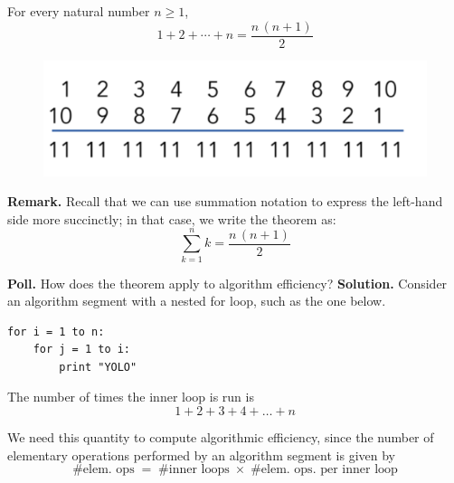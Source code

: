 \documentclass[10pt]{beamer}
\begin{document}
\begin{frame}

\begin{mygreenbox}[title=\text{Theorem: Sum of the first $n$ natural numbers}]

For every natural number $n \geq 1$, 
\[ 1 + 2 + \cdots + n = \frac{n \, (n+1)}{2} \]
\end{mygreenbox}
\vfill 
\pause 
\begin{myyellowbox}[title=\text{Story: Gauss' solution from elementary school}]
\begin{figure}
\includegraphics[width=\textwidth]{images/gauss_sum.png}	
\end{figure}	
\end{myyellowbox}
\vfill 
\pause 
\colorbox{red!30}{\textbf{Remark.}} Recall that we can use summation notation to express the left-hand side more succinctly; in that case, we write the theorem as:
\[ \sum_{k=1}^n k =  \frac{n \, (n+1)}{2} \]
\end{frame}



\begin{frame}[fragile]

\colorbox{yellow!30}{\textbf{Poll.}} How does the theorem apply to algorithm efficiency?
\pause 
\vfill 
\colorbox{green!30}{\textbf{Solution.}} Consider an algorithm segment with a nested for loop, such as the one below.

\begin{myredbox}[title=\text{An algorithm segment with a nested for loop}]
\begin{lstlisting}
for i = 1 to n:
    for j = 1 to i:	
      	print "YOLO"
\end{lstlisting}
\end{myredbox}
\vfill 
\pause 

The number of times the inner loop is run is 
\[1+2+3+4+ \hdots + n \]

We need this quantity to compute algorithmic efficiency, since the number of elementary operations performed by an algorithm segment is given by
\[ \#  \text{elem. ops} \; = \; \#  \text{inner loops}   \; \times \; \#  \text{elem. ops. per inner loop} \]

\end{frame}
\end{document}
